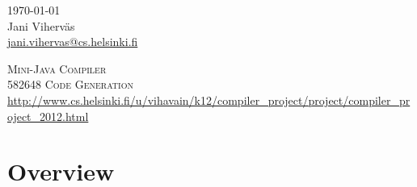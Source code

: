\documentclass[a4paper,12pt]{article}
\author{Jani Viherväs}
\begin{document}
\thispagestyle{empty} 
\begin{flushright}
\today \\
\vspace{1em}
Jani Viherväs\\ 
\href{mailto:jani.vihervas@cs.helsinki.fi}{jani.vihervas@cs.helsinki.fi}
\end{flushright}

\vfill

\begin{center}
\textsc{\LARGE Mini-Java Compiler} \\
\vspace{1em}
\textsc{\large 582648 Code Generation}\\
\vspace{1em}
\url{http://www.cs.helsinki.fi/u/vihavain/k12/compiler_project/project/compiler_project_2012.html}
\end{center}

\vfill

\setcounter{page}{1}

\section{Overview}
\end{document}
